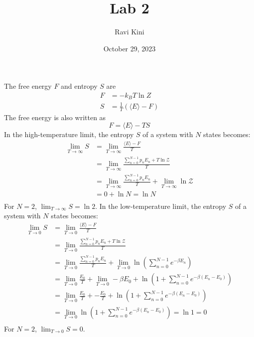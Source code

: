 \documentclass{article}
\title{Lab 2}
\author{Ravi Kini}
\date{October 29, 2023}
\begin{document}
\maketitle


\problem
The free energy $F$ and entropy $S$ are
\begin{equation}
    \begin{split}
        F & = -k_B T \ln Z \\
        S & = \frac{1}{T}\left(\langle E \rangle - F\right)
    \end{split}
\end{equation}
The free energy is also written as
\begin{equation}
    F = \langle E \rangle - TS
\end{equation}
In the high-temperature limit, the entropy $S$ of a system with $N$ states becomes:
\begin{equation}
    \begin{split}
        \lim_{T\to\infty} S & = \lim_{T\to\infty} \frac{\langle E \rangle - F}{T} \\
        & = \lim_{T\to\infty} \frac{\sum_{n=0}^{N-1}p_n E_n + T\ln\mathcal{Z}}{T} \\
        & = \lim_{T\to\infty} \frac{\sum_{n=0}^{N-1}p_n E_n}{T} + \lim_{T\to\infty} \ln\mathcal{Z} \\
        & = 0 + \ln N = \ln N \\
    \end{split}
\end{equation}
For $N = 2$, $\lim_{T\to\infty} S = \ln 2$.
In the low-temperature limit, the entropy $S$ of a system with $N$ states becomes:
\begin{equation}
    \begin{split}
        \lim_{T\to 0} S & = \lim_{T\to 0} \frac{\langle E \rangle - F}{T} \\
        & = \lim_{T\to 0} \frac{\sum_{n=0}^{N-1}p_n E_n + T\ln\mathcal{Z}}{T} \\
        & = \lim_{T\to 0} \frac{\sum_{n=0}^{N-1}p_n E_n}{T} + \lim_{T\to 0} \ln(\sum_{n=0}^{N-1}e^{-\beta E_n}) \\
        & = \lim_{T\to 0} \frac{E_0}{T} + \lim_{T\to 0} -\beta E_0 + \ln(1 + \sum_{n=0}^{N-1}e^{-\beta (E_n - E_0)}) \\
        & = \lim_{T\to 0} \frac{E_0}{T} + -\frac{E_0}{T} + \ln(1 + \sum_{n=0}^{N-1}e^{-\beta (E_n - E_0)}) \\
        & = \lim_{T\to 0} \ln\left(1 + \sum_{n=0}^{N-1}e^{-\beta (E_n - E_0)}\right) = \ln 1 = 0 \\
    \end{split}
\end{equation}
For $N = 2$, $\lim_{T\to 0} S = 0$.
\end{document}
